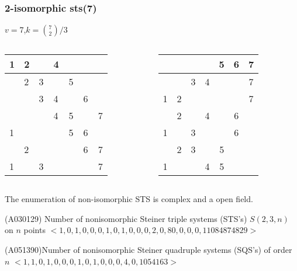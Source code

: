 \begin{frame}
\frametitle{2-isomorphic sts(7)}
$v=7$,\quad $k=\binom{7}{2}/3$

\begin{columns}
	\begin{table}
		\begin{tabular}{|l|l|l|l|c|c|c|}
			\hline
			1 & 2 & ~ & 4 & ~ & ~ & ~ \\ \hline
			~ & 2 & 3 & ~ & 5 & ~ & ~ \\ \hline
			~ & ~ & 3 & 4 & ~ & 6 & ~ \\ \hline
			~ & ~ & ~ & 4 & 5 & ~ & 7 \\ \hline
			1 & ~ & ~ & ~ & 5 & 6 & ~ \\ \hline
			~ & 2 & ~ & ~ & ~ & 6 & 7 \\ \hline
			1 & ~ & 3 & ~ & ~ & ~ & 7 \\ \hline
		\end{tabular}
	\end{table}

	\begin{table}[]
		\begin{tabular}{|c|c|c|c|c|c|c|}
			\hline
			&   &   &   & 5 & 6 & 7 \\ \hline
			&   & 3 & 4 &   &   & 7 \\ \hline
			1 & 2 &   &   &   &   & 7 \\ \hline
			& 2 &   & 4 &   & 6 &   \\ \hline
			1 &   & 3 &   &   & 6 &   \\ \hline
			& 2 & 3 &   & 5 &   &   \\ \hline
			1 &   &   & 4 & 5 &   &   \\ \hline
		\end{tabular}
	\end{table}
\end{columns}
\end{frame}


\begin{frame}
\pause[1]
\begin{block}{}
The enumeration of non-isomorphic STS is complex and a open field.
\end{block}


\pause[2]
\begin{block}{(A030129) Number of nonisomorphic Steiner triple systems (STS's) $S(2,3,n)$ on $n$ points}
	$<1, 0, 1, 0, 0, 0, 1, 0, 1, 0, 0, 0, 2, 0, 80, 0, 0, 0, 11084874829>$%
\end{block}
\begin{block}{(A051390)Number of nonisomorphic Steiner quadruple systems (SQS's) of order $n$ }
	$<1, 1, 0, 1, 0, 0, 0, 1, 0, 1, 0, 0, 0, 4, 0, 1054163>$%
\end{block}
\end{frame}

